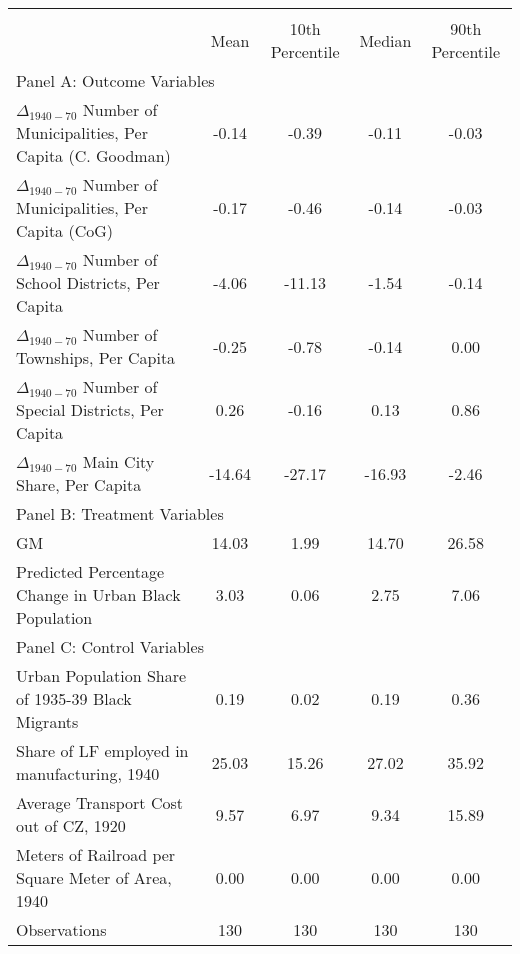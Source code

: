  \begin{tabular}{l*{4}{c}} \toprule
                &\multicolumn{4}{c}{}                   \\
                &     Mean&10th Percentile&   Median&90th Percentile\\
\cmidrule(lr){1-5}
\multicolumn{5}{l}{Panel A: Outcome Variables}\\
\cmidrule(lr){1-5}
$\Delta_{1940-70}$ Number of Municipalities, Per Capita (C. Goodman)&    -0.14&    -0.39&    -0.11&    -0.03\\
$\Delta_{1940-70}$ Number of Municipalities, Per Capita (CoG)&    -0.17&    -0.46&    -0.14&    -0.03\\
$\Delta_{1940-70}$ Number of School Districts, Per Capita&    -4.06&   -11.13&    -1.54&    -0.14\\
$\Delta_{1940-70}$ Number of Townships, Per Capita&    -0.25&    -0.78&    -0.14&     0.00\\
$\Delta_{1940-70}$ Number of Special Districts, Per Capita&     0.26&    -0.16&     0.13&     0.86\\
$\Delta_{1940-70}$ Main City Share, Per Capita&   -14.64&   -27.17&   -16.93&    -2.46\\
\cmidrule(lr){1-5}
\multicolumn{5}{l}{Panel B: Treatment Variables}\\
\cmidrule(lr){1-5}
GM              &    14.03&     1.99&    14.70&    26.58\\
Predicted Percentage Change in Urban Black Population&     3.03&     0.06&     2.75&     7.06\\
\cmidrule(lr){1-5}
\multicolumn{5}{l}{Panel C: Control Variables}\\
\cmidrule(lr){1-5}
Urban Population Share of 1935-39 Black Migrants&     0.19&     0.02&     0.19&     0.36\\
Share of LF employed in manufacturing, 1940&    25.03&    15.26&    27.02&    35.92\\
Average Transport Cost out of CZ, 1920&     9.57&     6.97&     9.34&    15.89\\
Meters of Railroad per Square Meter of Area, 1940&     0.00&     0.00&     0.00&     0.00\\
\midrule Observations    &      130   &      130   &      130   &      130   \\    \bottomrule \end{tabular}
